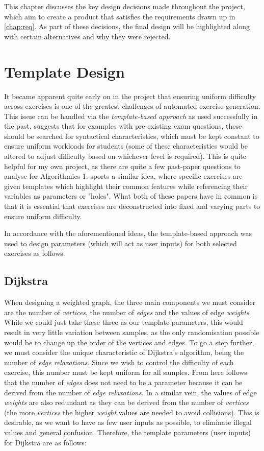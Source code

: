 \documentclass{l4proj}
\begin{document}
This chapter discusses the key design decisions made throughout the project, which aim to create a product that satisfies the requirements drawn up in \autoref{chap:req}. As part of these decisions, the final design will be highlighted along with certain alternatives and why they were rejected.

\section{Template Design}
\label{sec:td}

It became apparent quite early on in the project that ensuring uniform difficulty across exercises is one of the greatest challenges of automated exercise generation. This issue can be handled via the \emph{template-based approach} as used successfully in the past. \citet{Hoz21} suggests that for examples with pre-existing exam questions, these should be searched for syntactical characteristics, which must be kept constant to ensure uniform workloads for students (some of these characteristics would be altered to adjust difficulty based on whichever level is required). This is quite helpful for my own project, as there are quite a few past-paper questions to analyse for Algorithmics 1. \citet{Sad12} sports a similar idea, where specific exercises are given templates which highlight their common features while referencing their variables as parameters or "holes". What both of these papers have in common is that it is essential that exercises are deconstructed into fixed and varying parts to ensure uniform difficulty.

In accordance with the aforementioned ideas, the template-based approach was used to design parameters (which will act as user inputs) for both selected exercises as follows.

\subsection{Dijkstra}
\label{sec:tdd}

When designing a weighted graph, the three main components we must consider are the number of \emph{vertices}, the number of \emph{edges} and the values of edge \emph{weights}. While we could just take these three as our template parameters, this would result in very little variation between samples, as the only randomisation possible would be to change up the order of the vertices and edges. To go a step further, we must consider the unique characteristic of Dijkstra's algorithm, being the number of \emph{edge relaxations}. Since we wish to control the difficulty of each exercise, this number must be kept uniform for all samples. From here follows that the number of \emph{edges} does not need to be a parameter because it can be derived from the number of \emph{edge relaxations}. In a similar vein, the values of edge \emph{weights} are also redundant as they can be derived from the number of \emph{vertices} (the more \emph{vertices} the higher \emph{weight} values are needed to avoid collisions). This is desirable, as we want to have as few user inputs as possible, to eliminate illegal values and general confusion. Therefore, the template parameters (user inputs) for Dijkstra are as follows:
\end{document}
